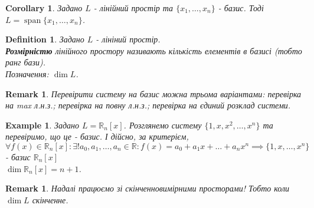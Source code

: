 \documentclass[a4paper, 10pt]{article}
\theoremstyle{theoremdd}
\newtheorem{definition}[theorem]{Definition}
\newtheorem{example}[theorem]{Example}
\newtheorem{remark}[theorem]{Remark}
\newtheorem{corollary}[theorem]{Corollary}
\DeclareMathOperator{\linspan}{span}
\begin{document}
	\begin{corollary}
	Задано $L$ - лінійний простір та $\{x_1,\dots,x_n\}$ - базис. Тоді $L = \linspan\{x_1,\dots,x_n\}$.
	\end{corollary}
	
	\begin{definition}
	Задано $L$ - лініний простір.\\
	\textbf{Розмірністю} лінійного простору називають кількість елементів в базисі (тобто ранг бази).\\
	Позначення: $\dim L$.
	\end{definition}
	
	\begin{remark}
	Перевірити систему на базис можна трьома варіантами: перевірка на max л.н.з.; перевірка на повну л.н.з.; перевірка на єдиний розклад системи.
	\end{remark}
	
	\begin{example}
	Задано $L = \mathbb{R}_n[x]$. Розглянемо систему $\{1, x, x^2, \dots, x^n\}$ та перевіримо, що це - базис. І дійсно, за критерієм,\\
	$\forall f(x) \in \mathbb{R}_n[x]: \exists! a_0, a_1, \dots, a_n \in \mathbb{R}: f(x) = a_0 + a_1 x + \dots + a_n x^n \implies \{1, x, \dots, x^n\}$ - базис $\mathbb{R}_n[x]$ \\ $\dim{\mathbb{R}_n[x]} = n+1$.
	\end{example}
	
	\begin{remark}
	Надалі працюємо зі скінченновимірними просторами! Тобто коли $\dim L$ скінченне.
	\end{remark}
	
\end{document}
